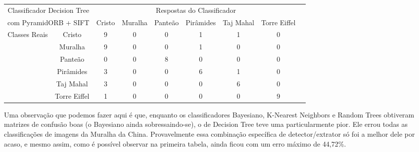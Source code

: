 \documentclass[a4paper,11pt]{article}
\begin{document}
  \hspace{-75pt}
  \begin{tabular}{|cc|c|c|c|c|c|c|c|}
    \hline
    \multicolumn{2}{|c|}{Classificador Decision Tree} &
    \multicolumn{6}{|c|}{Respostas do Classificador} \\
    \cline{3-8}
    \multicolumn{2}{|c|}{com PyramidORB + SIFT}
    & Cristo & Muralha & Panteão & Pirâmides & Taj Mahal & Torre Eiffel \\
    \hline
    \multirow{6}{*}{Classes Reais}
    & \multicolumn{1}{|c|}{Cristo} & 9 & 0 & 0 & 1 & 1 & 0 \\
    \cline{2-8}
    & \multicolumn{1}{|c|}{Muralha} & 9 & 0 & 0 & 1 & 0 & 0\\
    \cline{2-8}
    & \multicolumn{1}{|c|}{Panteão} & 0 & 0 & 8 & 0 & 0 & 0\\
    \cline{2-8}
    & \multicolumn{1}{|c|}{Pirâmides} & 3 & 0 & 0 & 6 & 1 & 0\\
    \cline{2-8}
    & \multicolumn{1}{|c|}{Taj Mahal} & 3 & 0 & 0 & 0 & 6 & 0\\
    \cline{2-8}
    & \multicolumn{1}{|c|}{Torre Eiffel} & 1 & 0 & 0 & 0 & 0 & 9\\
    \hline
  \end{tabular}
  \vspace{15pt}

  Uma observação que podemos fazer aqui é que, enquanto os classificadores
  Bayesiano, K-Nearest Neighbors e Random Trees obtiveram matrizes de confusão
  boas (o Bayesiano ainda sobressaindo-se), o de Decision Tree teve uma
  particularmente pior. Ele errou todas as classificações de imagens da Muralha
  da China. Provavelmente essa combinação específica de detector/extrator só foi
  a melhor dele por acaso, e mesmo assim, como é possível observar na primeira
  tabela, ainda ficou com um erro máximo de 44,72\%.
\end{document}
